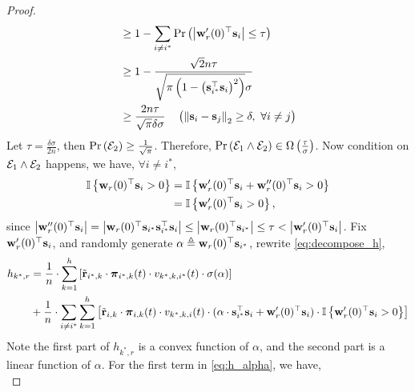 \documentclass[10pt]{article}
\begin{document}
\begin{proof}
\begin{equation*}
\begin{split}
	&\ge 1 - \sum\limits_{i \not= i^*}{ {\text{Pr}}\left(\left| {\mathbf{w}}_r^\prime(0)^\top {\mathbf{s}}_i \right| \le \tau \right) } \\
	&\ge 1 - \frac{\sqrt{2}n\tau}{\sqrt{\pi\left( 1 - \left({\mathbf{s}}_{i^*}^\top {\mathbf{s}}_{i} \right)^2 \right) }\sigma} \\
	&\ge \frac{2n\tau}{\sqrt{\pi}\delta\sigma} \quad \left( \left\| {\mathbf{s}}_{i} -  {\mathbf{s}}_{j} \right\|_2 \ge \delta, \ \forall i \not= j \right)
\end{split}
\end{equation*}
Let $\tau = \frac{\delta\sigma}{2n}$, then ${\text{Pr}}\left({\mathcal{E}}_2\right) \ge \frac{1}{\sqrt{\pi}}$. Therefore, ${\text{Pr}}\left( {\mathcal{E}}_1 \land {\mathcal{E}}_2 \right) \in \Omega\left( \frac{\tau}{\sigma} \right)$. Now condition on ${\mathcal{E}}_1 \land {\mathcal{E}}_2$ happens, we have, $\forall i \not= i^*$,
\begin{equation*}
\begin{split}
	{\mathbb{I}}\left\{ {\mathbf{w}}_r(0)^\top {\mathbf{s}}_i > 0 \right\} &= {\mathbb{I}}\left\{ {\mathbf{w}}_r^\prime(0)^\top {\mathbf{s}}_i + {\mathbf{w}}_r^{\prime\prime}(0)^\top {\mathbf{s}}_{i} > 0 \right\} \\
	&= {\mathbb{I}}\left\{ {\mathbf{w}}_r^\prime(0)^\top {\mathbf{s}}_i > 0 \right\},
\end{split}
\end{equation*}
since $\left| {\mathbf{w}}_r^{\prime\prime}(0)^\top {\mathbf{s}}_{i} \right| = \left| {\mathbf{w}}_r(0)^\top {\mathbf{s}}_{i^*} {\mathbf{s}}_{i^*}^\top {\mathbf{s}}_{i} \right| \le \left| {\mathbf{w}}_r(0)^\top {\mathbf{s}}_{i^*} \right| \le \tau < \left| {\mathbf{w}}_r^\prime(0)^\top {\mathbf{s}}_i  \right|$. Fix ${\mathbf{w}}_r^\prime(0)^\top {\mathbf{s}}_i$, and randomly generate $\alpha \triangleq {\mathbf{w}}_r(0)^\top {\mathbf{s}}_{i^*}$, rewrite \cref{eq:decompose_h},
\begin{equation}
\label{eq:h_alpha}
\begin{split}
	h_{k^*,r} &= \frac{1}{n} \cdot \sum\limits_{k=1}^{h}{ \left[ {\tilde{\mathbf{r}}}_{i^*,k} \cdot {\boldsymbol{\pi}}_{i^*,k}(t) \cdot v_{k^*,k,i^*}(t) \cdot \sigma(\alpha) \right] } \\
	&+ \frac{1}{n} \cdot \sum\limits_{i \not= i^*}{\sum\limits_{k=1}^{h}{ \left[ {\tilde{\mathbf{r}}}_{i,k} \cdot {\boldsymbol{\pi}}_{i,k}(t) \cdot v_{k^*,k,i}(t) \cdot ( \alpha \cdot {\mathbf{s}}_{i^*}^\top {\mathbf{s}}_{i} + {\mathbf{w}}_r^\prime(0)^\top {\mathbf{s}}_i ) \cdot {\mathbb{I}}\left\{ {\mathbf{w}}_r^\prime(0)^\top {\mathbf{s}}_i > 0 \right\}  \right] } }
\end{split}
\end{equation}
Note the first part of $h_{k^*,r}$ is a convex function of $\alpha$, and the second part is a linear function of $\alpha$. For the first term in \cref{eq:h_alpha}, we have,
\begin{equation*}

\end{equation*}
\end{proof}
\end{document}

